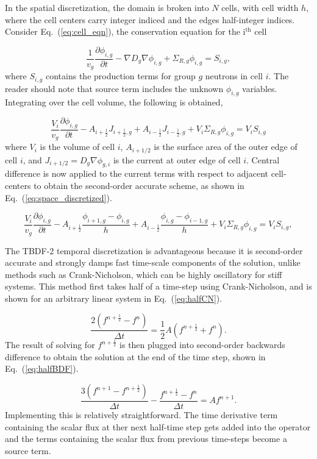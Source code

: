 \documentclass[12pt]{article}
\newcommand{\fn}[1]{\left( #1 \right)}
\newcommand{\dxdt}[1]{\frac{\partial #1}{\partial t}}
\newcommand{\be}{\begin{equation}}
\newcommand{\ee}{\end{equation}}
\newcommand{\LEQ}[1]{\label{eq:#1}}
\newcommand{\EQ}[1]{Eq.~(\ref{eq:#1})}
\newcommand{\half}{\frac{1}{2}}
\begin{document}
In the spatial discretization, the domain is broken into $N$ cells, with cell width $h$, where the 
cell centers carry integer indiced and the edges half-integer indices. 
Consider \EQ{cell_eqn}, the conservation equation for the i$^{\text{th}}$ cell

\be
	 \frac{1}{v_g} \dxdt{\phi_{i,g}} - \nabla D_{g} \nabla \phi_{i,g} + \Sigma_{R,g} \phi_{i,g}  =  S_{i,g},
\LEQ{cell_eqn} \ee
where $S_{i,g}$ contains the production terms for group $g$ neutrons in cell $i$. 
The reader should note that source term includes the unknown $ \phi_{i,g} $ variables. 
Integrating over the cell volume, the following is obtained,

\be
	\frac{V_i}{v_g} \dxdt{\phi_{i,g}} - A_{i+\half} J_{i+\half,g} + A_{i-\half} J_{i-\half,g} + V_i \Sigma_{R,g} \phi_{i,g} = V_i S_{i,g}
\ee
where $V_i $ is the volume of cell $i$, $ A_{i+1/2} $ is the surface area of the outer edge of cell $i$, 
and $ J_{i+1/2} = D_g \nabla \phi_{g,i} $ is the current at outer edge of cell $i$. 
Central difference is now applied to the current terms with respect to adjacent cell-centers to obtain the 
second-order accurate scheme, as shown in \EQ{space_discretized}.

\be
	\frac{V_i}{v_g} \dxdt{\phi_{i,g}} - A_{i+\half} \frac{\phi_{i+1,g} - \phi_{i,g}}{h} + A_{i-\half} \frac{\phi_{i,g} - \phi_{i-1,g}}{h} + 
	V_i \Sigma_{R,g} \phi_{i,g} = V_i S_{i,g},
 \LEQ{space_discretized} \ee


The TBDF-2 temporal discretization is advantageous because it is second-order accurate and strongly damps 
fast time-scale components of the solution, unlike methods such as Crank-Nicholson, 
which can be highly oscillatory for stiff systems. 
This method first takes half of a time-step using Crank-Nicholson, and is shown for an arbitrary linear system in \EQ{halfCN}. 

\be
	\frac{2 \fn{ f^{n+\half} - f^n }}{\Delta t} =  \half A \fn{f^{n+\half} + f^n}.
\LEQ{halfCN} \ee
The result of solving for $f^{n+\half}$ is then plugged into second-order backwards difference to obtain the solution 
at the end of the time step, shown in \EQ{halfBDF}.

\be
	\frac{3 \fn{ f^{n+1} - f^{n+\half} }}{\Delta t} - \frac{f^{n+\half} - f^n}{\Delta t} = A f^{n+1}.
\LEQ{halfBDF} \ee 
Implementing this is relatively straightforward. 
The time derivative term containing the scalar flux at ther next half-time step gets added into the operator and 
the terms containing the scalar flux from previous time-steps become a source term.
\end{document}
